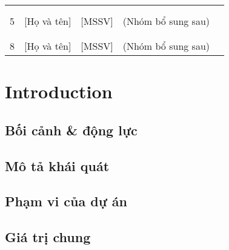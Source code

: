 \begin{table}[H]
\begin{tabular}{|c|c|c|c|l|}
                    &                                  &                           &                    &                                                                 \\ \cline{5-5} 
                    &                                  &                           &                    &                                                                 \\ \cline{5-5} 
\multirow{-3}{*}{5} & \multirow{-3}{*}{[Họ và tên]}     & \multirow{-3}{*}{[MSSV]}        & \multirow{-3}{*}{(Nhóm bổ sung sau)} &                                                                 \\ \hline
                    &                                  &                           &                    &                                                                 \\ \cline{5-5} 
                    &                                  &                           &                    &                                                                 \\ \cline{5-5}  
\multirow{-3}{*}{8} & \multirow{-3}{*}{[Họ và tên]}     & \multirow{-3}{*}{[MSSV]}        & \multirow{-3}{*}{(Nhóm bổ sung sau)} &                                                                 \\ \hline
\end{tabular}
\end{table}
\newpage


\section{Introduction}
\subsection{Bối cảnh \& động lực}

\subsection{Mô tả khái quát}

\subsection{Phạm vi của dự án}

\subsection{Giá trị chung}

